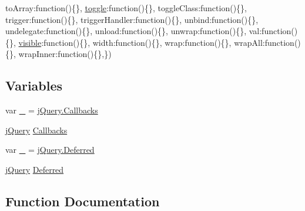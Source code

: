 \begin{DoxyCompactItemize}
\textquotesingle{}to\+Array\textquotesingle{}\+:function()\{\}, \textquotesingle{}\hyperlink{_scripts_2bootstrap_8min_8js_acf7cf7d86a171d1c082d8bf08f2de490}{toggle}\textquotesingle{}\+:function()\{\}, \textquotesingle{}toggle\+Class\textquotesingle{}\+:function()\{\}, \textquotesingle{}trigger\textquotesingle{}\+:function()\{\}, \textquotesingle{}trigger\+Handler\textquotesingle{}\+:function()\{\}, \textquotesingle{}unbind\textquotesingle{}\+:function()\{\}, \textquotesingle{}undelegate\textquotesingle{}\+:function()\{\}, \textquotesingle{}unload\textquotesingle{}\+:function()\{\}, \textquotesingle{}unwrap\textquotesingle{}\+:function()\{\}, \textquotesingle{}val\textquotesingle{}\+:function()\{\}, \textquotesingle{}\hyperlink{_scripts_2jquery-1_810_82_8min_8js_a52992524aa1f4d01d5c9f1b9a15c35f5}{visible}\textquotesingle{}\+:function()\{\}, \textquotesingle{}width\textquotesingle{}\+:function()\{\}, \textquotesingle{}wrap\textquotesingle{}\+:function()\{\}, \textquotesingle{}wrap\+All\textquotesingle{}\+:function()\{\}, \textquotesingle{}wrap\+Inner\textquotesingle{}\+:function()\{\},\})
\end{DoxyCompactItemize}
\subsection*{Variables}
\begin{DoxyCompactItemize}
\item 
var \hyperlink{jquery-1_810_82_8intellisense_8js_af58a9af35e2376001e3219aef7e0bda3}{\+\_} = \hyperlink{jquery-1_810_82_8intellisense_8js_add8d59d25831bb9b171fdbee8a18795b}{j\+Query.\+Callbacks}
\item 
\hyperlink{_scripts_2jquery-1_810_82_8js_a5e01048fbd3a30b44e8d491d8945c457}{j\+Query} \hyperlink{jquery-1_810_82_8intellisense_8js_add8d59d25831bb9b171fdbee8a18795b}{Callbacks}
\item 
var \hyperlink{jquery-1_810_82_8intellisense_8js_a2378dbe13bea17e176a553e3f262f342}{\+\_} = \hyperlink{jquery-1_810_82_8intellisense_8js_ab355ffd82371d88c17da7c1dae9e8829}{j\+Query.\+Deferred}
\item 
\hyperlink{_scripts_2jquery-1_810_82_8js_a5e01048fbd3a30b44e8d491d8945c457}{j\+Query} \hyperlink{jquery-1_810_82_8intellisense_8js_ab355ffd82371d88c17da7c1dae9e8829}{Deferred}
\end{DoxyCompactItemize}


\subsection{Function Documentation}
\hypertarget{jquery-1_810_82_8intellisense_8js_ad1527630d45bb696c9bc5e21e4bd7355}{}
